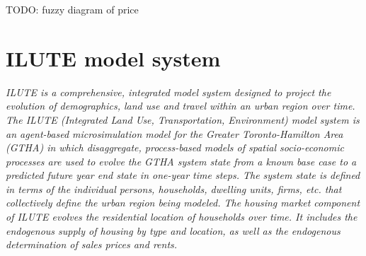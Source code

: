 TODO: fuzzy diagram of price

\section{ILUTE model system} \label{sec:ilute}

\textit{ILUTE is a comprehensive, integrated model system designed to project the evolution of demographics, land use and travel within an urban region over time.
The ILUTE (Integrated Land Use, Transportation, Environment) model system is an agent-based microsimulation model for the Greater Toronto-Hamilton Area (GTHA) in which disaggregate, process-based models of spatial socio-economic processes are used to evolve the GTHA system state from a known base case to a predicted future year end state in one-year time steps.
The system state is defined in terms of the individual persons, households, dwelling units, firms, etc.
that collectively define the urban region being modeled.
The housing market component of ILUTE evolves the residential location of households over time.
It includes the endogenous supply of housing by type and location, as well as the endogenous determination of sales prices and rents.}\cite{Miller2010}